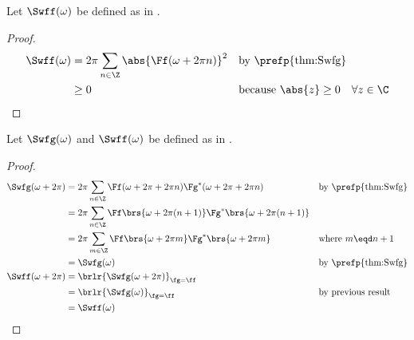 \begin{proposition}
\label{prop:ps_nonnegative}
Let $\Swff(\omega)$ be defined as in .
\end{proposition}
\begin{proof}
\begin{align*}
  \Swff(\omega) 
    &= {2\pi}\sum_{n\in\Z} \abs{\Ff(\omega+2\pi n)}^2
    && \text{by \prefp{thm:Swfg}}
  \\&\ge 0
    && \text{because $\abs{z}\ge0\quad\forall z\in\C$}
\end{align*}
\end{proof}

\begin{proposition}
\label{prop:ps_periodic}
Let $\Swfg(\omega)$ and $\Swff(\omega)$ be defined as in .
\end{proposition}
\begin{proof}
\begin{align*}
  \Swfg(\omega+2\pi) 
    &= {2\pi}\sum_{n\in\Z} \Ff(\omega+2\pi+2\pi n) \Fg^\ast(\omega+2\pi+2\pi n)
    && \text{by \prefp{thm:Swfg}}
  \\&= {2\pi}\sum_{n\in\Z} \Ff\brs{\omega+2\pi(n+1)} \Fg^\ast\brs{\omega+2\pi(n+1)}
  \\&= {2\pi}\sum_{m\in\Z} \Ff\brs{\omega+2\pi m} \Fg^\ast\brs{\omega+2\pi m}
    && \text{where $m\eqd n+1$}
  \\&= \Swfg(\omega)
    && \text{by \prefp{thm:Swfg}}
  \\
  \Swff(\omega+2\pi) 
    &= \brlr{\Swfg(\omega+2\pi)}_{\fg=\ff}
  \\&= \brlr{\Swfg(\omega)}_{\fg=\ff}
    && \text{by previous result}
  \\&= \Swff(\omega)
\end{align*}
\end{proof}

